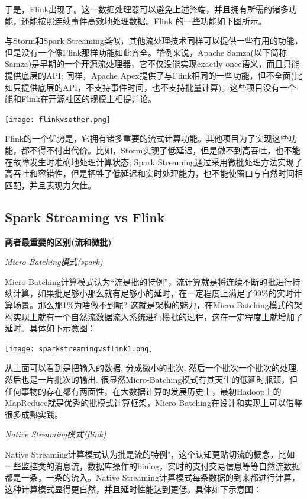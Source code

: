 \documentclass[oneside]{ctexbook}
\begin{document}
于是，Flink出现了。这一数据处理器可以避免上述弊端，并且拥有所需的诸多功能，还能按照连续事件高效地处理数据。Flink 的一些功能如下图所示。

与Storm和Spark Streaming类似，其他流处理技术同样可以提供一些有用的功能，但是没有一个像Flink那样功能如此齐全。举例来说，Apache Samza(以下简称Samza)是早期的一个开源流处理器，它不仅没能实现exactly-once语义，而且只能提供底层的API; 同样，Apache Apex提供了与Flink相同的一些功能，但不全面(比如只提供底层的API，不支持事件时间，也不支持批量计算)。这些项目没有一个能和Flink在开源社区的规模上相提并论。

\noindent \texttt{[image: flinkvsother.png]}

Flink的一个优势是，它拥有诸多重要的流式计算功能。其他项目为了实现这些功能，都不得不付出代价。比如，Storm实现了低延迟，但是做不到高吞吐，也不能在故障发生时准确地处理计算状态; Spark Streaming通过采用微批处理方法实现了高吞吐和容错性，但是牺牲了低延迟和实时处理能力，也不能使窗口与自然时间相匹配，并且表现力欠佳。

\subsection{Spark Streaming vs Flink}

\textbf{两者最重要的区别(流和微批)}

\textit{Micro Batching模式(spark)}

Micro-Batching计算模式认为“流是批的特例”，流计算就是将连续不断的批进行持续计算，如果批足够小那么就有足够小的延时，在一定程度上满足了99\%的实时计算场景。那么那1\%为啥做不到呢? 这就是架构的魅力，在Micro-Batching模式的架构实现上就有一个自然流数据流入系统进行攒批的过程，这在一定程度上就增加了延时。具体如下示意图：

\noindent \texttt{[image: sparkstreamingvsflink1.png]}

从上面可以看到是把输入的数据, 分成微小的批次, 然后一个批次一个批次的处理, 然后也是一片批次的输出. 很显然Micro-Batching模式有其天生的低延时瓶颈，但任何事物的存在都有两面性，在大数据计算的发展历史上，最初Hadoop上的MapReduce就是优秀的批模式计算框架，Micro-Batching在设计和实现上可以借鉴很多成熟实践。

\textit{Native Streaming模式(flink)}

Native Streaming计算模式认为批是流的特例"，这个认知更贴切流的概念，比如一些监控类的消息流，数据库操作的binlog，实时的支付交易信息等等自然流数据都是一条，一条的流入。Native Streaming计算模式每条数据的到来都进行计算，这种计算模式显得更自然，并且延时性能达到更低。具体如下示意图：
\end{document}
